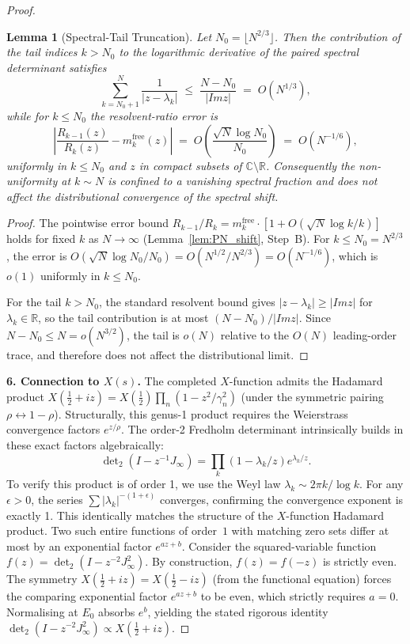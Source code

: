 \documentclass{pre-aomart}
\def\Im{Im}%
\def\xi{X}%
\theoremstyle{plain}
\newtheorem{lemma}[theorem]{Lemma}
\theoremstyle{definition}
\theoremstyle{remark}
\begin{document}
\begin{proof}
\begin{lemma}[Spectral-Tail Truncation]\label{lem:spectral_tail}
Let $N_0 = \lfloor N^{2/3}\rfloor$.  Then the contribution of the
tail indices $k > N_0$ to the logarithmic derivative of the
paired spectral determinant satisfies
\[
\sum_{k=N_0+1}^{N} \frac{1}{|z - \lambda_k|}
\;\le\; \frac{N - N_0}{|\Im z|}
\;=\; O(N^{1/3}),
\]
while for $k \le N_0$ the resolvent-ratio error is
\[
\left|\frac{R_{k-1}(z)}{R_k(z)}
  - m_k^{\mathrm{free}}(z)\right|
\;=\; O\!\left(\frac{\sqrt{N}\log N_0}{N_0}\right)
\;=\; O(N^{-1/6}),
\]
uniformly in $k \le N_0$ and $z$ in compact subsets of
$\mathbb{C}\setminus\mathbb{R}$.
Consequently the non-uniformity at $k \sim N$ is confined to a
vanishing spectral fraction and does not affect the
distributional convergence of the spectral shift.
\end{lemma}

\begin{proof}
The pointwise error bound
$R_{k-1}/R_k = m_k^{\mathrm{free}} \cdot [1 + O(\sqrt{N}\log k/k)]$
holds for fixed $k$ as $N \to \infty$ (Lemma~\ref{lem:PN_shift},
Step~B).  For $k \le N_0 = N^{2/3}$, the error is
$O(\sqrt{N}\log N_0/N_0) = O(N^{1/2}/N^{2/3}) = O(N^{-1/6})$,
which is $o(1)$ uniformly in $k \le N_0$.

For the tail $k > N_0$, the standard resolvent bound gives
$|z - \lambda_k| \ge |\Im z|$ for $\lambda_k \in \mathbb{R}$,
so the tail contribution is at most $(N - N_0)/|\Im z|$.
Since $N - N_0 \le N = o(N^{3/2})$, the tail is $o(N)$ relative
to the $O(N)$ leading-order trace, and therefore does not affect
the distributional limit.
\end{proof}

\textbf{6. Connection to $\xi(s)$.}
The completed $\xi$-function admits the Hadamard product
$\xi(\frac12+iz) = \xi(\frac12)\prod_n(1 - z^2/\gamma_n^2)$
(under the symmetric pairing $\rho \leftrightarrow 1-\rho$).
Structurally, this genus-1 product requires the Weierstrass convergence
factors $e^{z/\rho}$. The order-2 Fredholm determinant intrinsically
builds in these exact factors algebraically:
\[
\det\nolimits_2(I - z^{-1}J_\infty) = \prod_{k} (1 - \lambda_k/z) e^{\lambda_k/z}.
\]
To verify this product is of order 1, we use the Weyl law $\lambda_k \sim 2\pi k/\log k$. For any $\epsilon > 0$, the series $\sum |\lambda_k|^{-(1+\epsilon)}$ converges, confirming the convergence exponent is exactly 1. 
This identically matches the structure of the $\xi$-function Hadamard
product. Two such entire functions of order~$1$ with matching zero sets differ at most by an exponential factor $e^{az+b}$. Consider the squared-variable function $f(z) = \det_2(I - z^{-2}J_\infty^2)$. By construction, $f(z) = f(-z)$ is strictly even. The symmetry $\xi(\frac12+iz) = \xi(\frac12-iz)$ (from the functional equation) forces the comparing exponential factor $e^{az+b}$ to be even, which strictly requires $a=0$. Normalising at $E_0$ absorbs $e^b$, yielding the stated rigorous identity
$\det_2(I - z^{-2}J_\infty^2) \propto \xi(\frac12+iz)$.
\end{proof}
\end{document}
